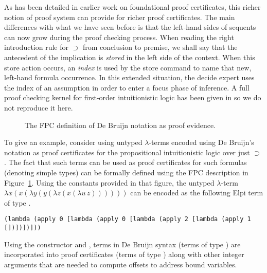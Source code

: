 As has been detailed in earlier work on foundational proof
certificates, this richer notion of proof system can provide for
richer proof certificates.  The main differences with what we have
seen before is that the left-hand sides of sequents can now grow
during the proof checking process.  When reading the right
introduction rule for $\supset$ from conclusion to premise, we shall
say that the antecedent of the implication is \emph{stored} in the
left side of the context.  When this store action occurs, an
\emph{index} is used by the store command to name that new, left-hand
formula occurrence.  In this extended situation, the decide expert
uses the index of an assumption in order to enter a focus phase of
inference.  A full proof checking kernel for first-order
intuitionistic logic has been given in \cite{chihani17jar} so we do
not reproduce it here.

\begin{figure}


\caption{The FPC definition of De Bruijn notation as proof evidence.}
\label{fig:debruijn}
\end{figure}

To give an example, consider using untyped $\lambda$-terms encoded
using De Bruijn's notation as proof certificates for the propositional
intuitionistic logic over just $\supset$.  The fact that such terms
can be used as proof certificates for such formulas (denoting simple
types) can be formally defined using the FPC description in
Figure~\ref{fig:debruijn}.
%
Using the constants provided in that figure, the untyped
$\lambda$-term $\lambda x (x (\lambda y (y (\lambda z (x (\lambda
u\,z))))))$ can be encoded as the following Elpi term of type
.
%
\begin{small}
\begin{lstlisting}[basicstyle=\ttfamily,language=lprolog]
(lambda (apply 0 [lambda (apply 0 [lambda (apply 2 [lambda (apply 1 [])])])]))
\end{lstlisting}
\end{small}
Using the constructor  and , terms in De Bruijn
syntax (terms of type ) are incorporated into proof
certificates (terms of type ) along with other integer
arguments that are needed to compute offsets to address bound
variables.  

